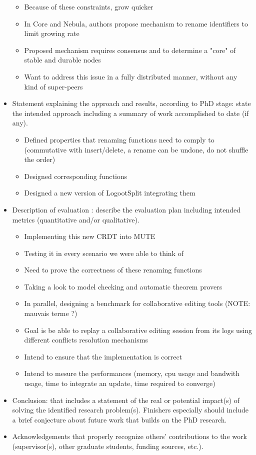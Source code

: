 \documentclass{article}
\begin{document}
\begin{itemize}
\begin{itemize}
            \item Because of these constraints, grow quicker
            \item In Core and Nebula, authors propose mechanism to rename identifiers to limit growing rate
            \item Proposed mechanism requires consensus and to determine a "core" of stable and durable nodes
            \item Want to address this issue in a fully distributed manner, without any kind of super-peers
        \end{itemize}
        \item Statement explaining the approach and results, according to PhD stage: state the intended approach including a summary of work accomplished to date (if any).
        \begin{itemize}
            \item Defined properties that renaming functions need to comply to (commutative with insert/delete, a rename can be undone, do not shuffle the order)
            \item Designed corresponding functions
            \item Designed a new version of LogootSplit integrating them
        \end{itemize}
        \item Description of evaluation : describe the evaluation plan including intended metrics (quantitative and/or qualitative).
        \begin{itemize}
            \item Implementing this new \ac{CRDT} into MUTE
            \item Testing it in every scenario we were able to think of
            \item Need to prove the correctness of these renaming functions
            \item Taking a look to model checking and automatic theorem provers
            \item In parallel, designing a benchmark for collaborative editing tools (NOTE: mauvais terme ?)
            \item Goal is be able to replay a collaborative editing session from its logs using different conflicts resolution mechanisms
            \item Intend to ensure that the implementation is correct
            \item Intend to mesure the performances (memory, cpu usage and bandwith usage, time to integrate an update, time required to converge)
        \end{itemize}
        \item Conclusion: that includes a statement of the real or potential impact(s) of solving the identified research problem(s). Finishers especially should include a brief conjecture about future work that builds on the PhD research.
        \item Acknowledgements that properly recognize others’ contributions to the work (supervisor(s), other graduate students, funding sources, etc.).
    \end{itemize}
\end{document}
